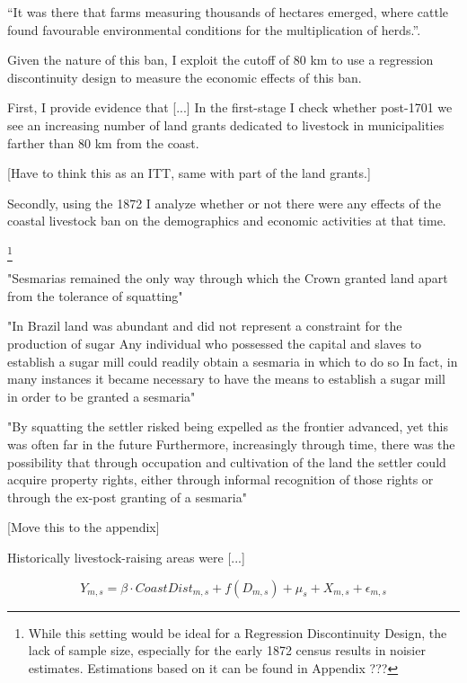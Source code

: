 \documentclass{article}
\begin{document}
``It was there that farms measuring thousands of hectares emerged, where cattle found favourable environmental conditions for the multiplication of herds.''\parencite{Ribeiro2012-lb}.


Given the nature of this ban, I exploit the cutoff of 80 km to use a regression discontinuity design to measure the economic effects of this ban. 

First, I provide evidence that [...] In the first-stage I check whether post-1701 we see an increasing number of land grants dedicated to livestock in municipalities farther than 80 km from the coast. 

[Have to think this as an ITT, same with part of the land grants.]

Secondly, using the 1872 I analyze whether or not there were any effects of the coastal livestock ban on the demographics and economic activities at that time.

\footnote{While this setting would be ideal for a Regression Discontinuity Design, the lack of sample size, especially for the early 1872 census results in noisier estimates. Estimations based on it can be found in Appendix ???}

\textcite{Mueller1995-gi} 

"Sesmarias  remained the only way through  which the  Crown granted  land apart from the tolerance  of squatting" 

"In Brazil land was abundant  and did not represent a constraint  for the production  of sugar   Any individual who 
possessed the capital  and slaves to establish a sugar mill could readily obtain a sesmaria  in which to do so   In fact,  in   many instances  it became necessary to have the means to establish a sugar mill  in order to be granted a sesmaria"

"By squatting the settler risked being expelled as the frontier  advanced, yet this was often  far  in the future   Furthermore,  increasingly   through time, there was the possibility that through occupation and cultivation of the land the settler could acquire  property rights, either through  informal  recognition of those rights or through the ex-post granting of a  sesmaria"

[Move this to the appendix]

Historically livestock-raising areas were [...]

\begin{equation}
  Y_{m,s} = \beta \cdot CoastDist_{m,s} + f(D_{m,s})+ \mu_s + X_{m,s} + \epsilon_{m,s}
\end{equation}
\end{document}
